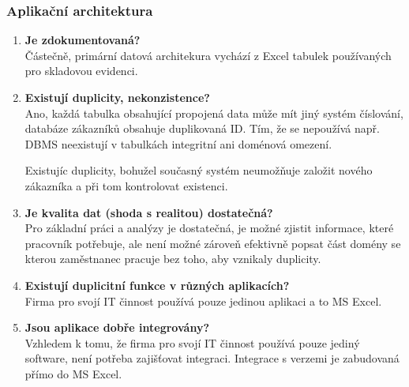 \documentclass{article}
\begin{document}
\subsubsection*{Aplikační architektura}
\begin{enumerate}
    \item \textbf{Je zdokumentovaná?}\\
        Částečně, primární datová architekura vychází z Excel tabulek používaných pro skladovou evidenci.

    \item \textbf{Existují duplicity, nekonzistence?} \\
        Ano, každá tabulka obsahující propojená data může mít jiný systém číslování, databáze zákazníků obsahuje duplikovaná ID. Tím, že se nepoužívá např. DBMS neexistují v tabulkách integritní ani doménová omezení.

        Existujíc duplicity, bohužel současný systém neumožňuje založit nového zákazníka a při tom kontrolovat existenci.

    \item \textbf{Je kvalita dat (shoda s realitou) dostatečná?} \\
        Pro základní práci a analýzy je dostatečná, je možné zjistit informace, které pracovník potřebuje, ale není možné zároveň efektivně popsat část domény se kterou zaměstnanec pracuje bez toho, aby vznikaly duplicity.

    \item \textbf{Existují duplicitní funkce v různých aplikacích?} \\
        Firma pro svojí IT činnost používá pouze jedinou aplikaci a to MS Excel.

    \item \textbf{Jsou aplikace dobře integrovány?} \\
        Vzhledem k tomu, že firma pro svojí IT činnost používá pouze jediný software, není potřeba zajišťovat integraci. Integrace s verzemi je zabudovaná přímo do MS Excel.
\end{enumerate}
\end{document}

